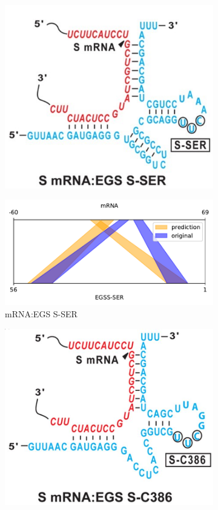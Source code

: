 \documentclass[twoside,a4paper]{report}
\begin{document}
	 
	 \begin{figure}[h!tb]
	 	\centering
	 	\begin{subfigure}{.25\textwidth}
	 		\centering
	 		\includegraphics[width=.9\linewidth]{mrnaegs}	
	 		\label{fig:mrnaegs}
	 	\end{subfigure}%
		\begin{subfigure}{.5\textwidth}
			\centering
			\includegraphics[width=.9\linewidth]{rricomparison7}
			\caption{mRNA:EGS S-SER}
			\label{fig:rricomparison7}
		\end{subfigure}
	 	\begin{subfigure}{.25\textwidth}
	 		\centering
	 		\includegraphics[width=.9\linewidth]{SC386}

\end{subfigure}
\end{figure}
\end{document}
